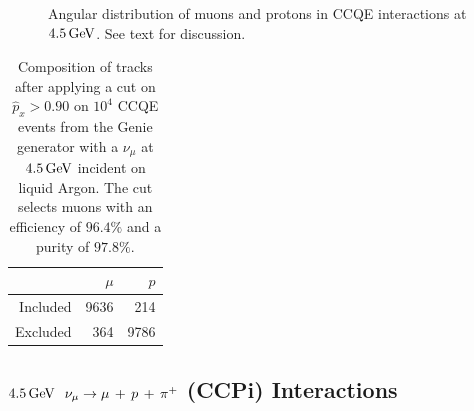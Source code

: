 \begin{figure}
{        \label{fig:ccqe-pz-4500}
    }
    \caption[Angular distribution of $\mu$, $p$ at $4.5\GeV$]{\label{fig:ccqe-4500-angle}Angular distribution of muons and protons in \acs{CCQE} interactions at $4.5\GeV$. See text for discussion.}
\end{figure}

\begin{table}
    \centering
    \begin{tabular}{*{3}{r}}
        & $\mu$ & $p$ \\
        \hline
        \hline
        Included & 9636 & 214 \\
        Excluded & 364 & 9786 \\
        \hline
    \end{tabular}
    \caption[Composition of tracks after cut on $\hat{p}_x$ for $4.5\GeV$ \acs{CCQE} events]{\label{table:cut-results-ccqe-4500-angle}Composition of tracks after applying a cut on $\hat{p}_x > 0.90$ on $10^4$ \acs{CCQE} events from the Genie generator with a $\nu_\mu$ at $4.5\GeV$ incident on liquid Argon. The cut selects muons with an efficiency of $96.4\%$ and a purity of $97.8\%$.}
\end{table}

\subsection{$4.5\GeV$ $\nu_\mu \rightarrow \mu\,+\,p\,+\,\pi^{+}$ (\acs{CCPi}) Interactions}
